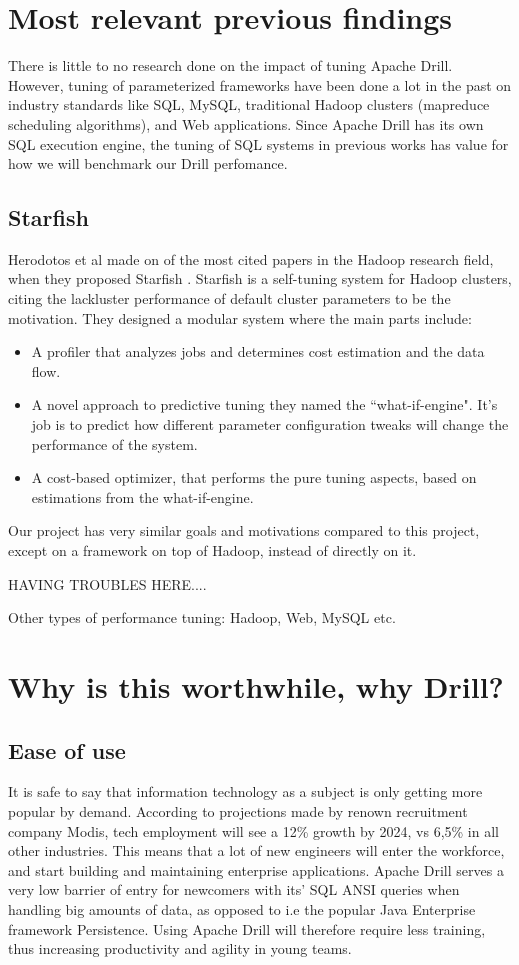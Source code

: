 \documentclass[a4paper,english]{report}
\begin{document}
		\section{Most relevant previous findings}
		There is little to no research done on the impact of tuning Apache Drill. However, tuning of parameterized frameworks have been done a lot in the past on industry standards like SQL, MySQL, traditional Hadoop clusters (mapreduce scheduling algorithms), and Web applications. Since Apache Drill has its own SQL execution engine,  the tuning of SQL systems in previous works has value for how we will benchmark our Drill perfomance.
			\subsection{Starfish}
			Herodotos et al made on of the most cited papers in the Hadoop research field, when they proposed Starfish \cite{starfish}. Starfish is a self-tuning system for Hadoop clusters, citing the lackluster performance of default cluster parameters to be the motivation. They designed a modular system where the main parts include:
			\begin{itemize}
				\item A profiler that analyzes jobs and determines cost estimation and the data flow.
				\item A novel approach to predictive tuning they named the ``what-if-engine". It's job is to predict how different parameter configuration tweaks will change the performance of the system.
				\item A cost-based optimizer, that performs the pure tuning aspects, based on estimations from the what-if-engine.
			\end{itemize}
			Our project has very similar goals and motivations compared to this project, except on a framework on top of Hadoop, instead of directly on it.
		
		
		HAVING TROUBLES HERE....
		
		Other types of performance tuning: Hadoop, Web, MySQL etc.
		
		\section{Why is this worthwhile, why Drill?}
		\label{sec:why_drill}
			\subsection{Ease of use}It is safe to say that information technology as a subject is only getting more popular by demand. According to projections made by renown recruitment company Modis, tech employment will see a 12\% growth by 2024, vs 6,5\% in all other industries\cite{modis}. This means that a lot of new engineers will enter the workforce, and start building and maintaining enterprise applications. Apache Drill serves a very low barrier of entry for newcomers with its' SQL ANSI queries when handling big amounts of data, as opposed to i.e the popular Java Enterprise framework Persistence. Using Apache Drill will therefore require less training, thus increasing productivity and agility in young teams.
\end{document}
